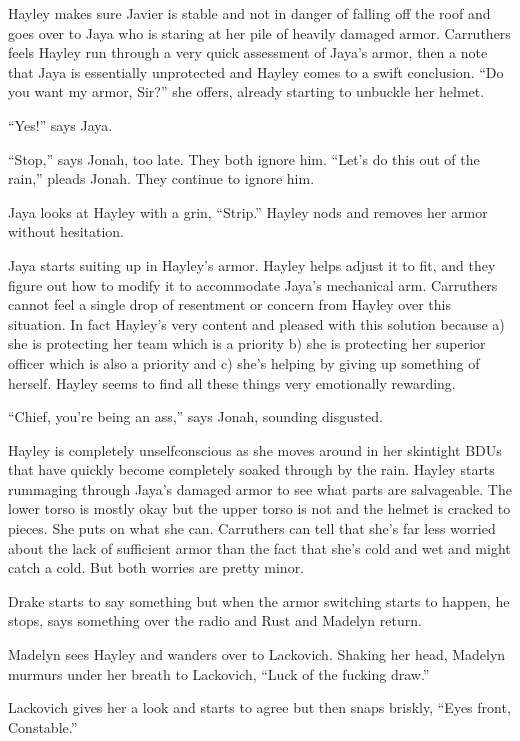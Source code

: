 Hayley makes sure Javier is stable and not in danger of falling off the roof and goes over to Jaya who is staring at her pile of heavily damaged armor.  Carruthers feels Hayley run through a very quick assessment of Jaya's armor, then a note that Jaya is essentially unprotected and Hayley comes to a swift conclusion.  ``Do you want my armor, Sir?'' she offers, already starting to unbuckle her helmet.

``Yes!'' says Jaya.

``Stop,'' says Jonah, too late.  They both ignore him.  ``Let's do this out of the rain,'' pleads Jonah.  They continue to ignore him.

Jaya looks at Hayley with a grin, ``Strip.''  Hayley nods and removes her armor without hesitation.

Jaya starts suiting up in Hayley's armor.  Hayley helps adjust it to fit, and they figure out how to modify it to accommodate Jaya's mechanical arm.  Carruthers cannot feel a single drop of resentment or concern from Hayley over this situation.  In fact Hayley's very content and pleased with this solution because a) she is protecting her team which is a priority b) she is protecting her superior officer which is also a priority and c) she's helping by giving up something of herself.  Hayley seems to find all these things very emotionally rewarding.  

``Chief, you're being an ass,'' says Jonah, sounding disgusted.



Hayley is completely unselfconscious as she moves around in her skintight BDUs that have quickly become completely soaked through by the rain.  Hayley starts rummaging through Jaya's damaged armor to see what parts are salvageable.  The lower torso is mostly okay but the upper torso is not and the helmet is cracked to pieces.  She puts on what she can.  Carruthers can tell that she's far less worried about the lack of sufficient armor than the fact that she's cold and wet and might catch a cold.  But both worries are pretty minor.



Drake starts to say something but when the armor switching starts to happen, he stops, says something over the radio and Rust and Madelyn return. 

Madelyn sees Hayley and wanders over to Lackovich.  Shaking her head, Madelyn murmurs under her breath to Lackovich, ``Luck of the fucking draw.''

Lackovich gives her a look and starts to agree but then snaps briskly, ``Eyes front, Constable.''

